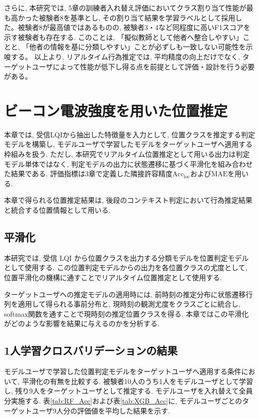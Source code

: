 \documentclass[a4paper,12pt]{jreport}
\begin{document}
さらに, 本研究では, 5章の訓練者入れ替え評価においてクラス割り当て性能が最も高かった被験者8を基準とし, その割り当て結果を学習ラベルとして採用した。被験者8が最高値ではあるものの, 被験者3・4など同程度に高いF1スコアを示す被験者も存在する. このことは, 「擬似教師として他者へ整合しやすい」ことと, 「他者の情報を基に分類しやすい」ことが必ずしも一致しない可能性を示唆する。
以上より, リアルタイム行為推定では, 平均精度の向上だけでなく, ターゲットユーザによって性能が低下し得る点を前提として評価・設計を行う必要がある。



\chapter{ビーコン電波強度を用いた位置推定}
本章では, 受信LQIから抽出した特徴量を入力として, 位置クラスを推定する判定モデルを構築し, モデルユーザで学習したモデルをターゲットユーザへ適用する枠組みを扱う. ただし, 本研究でリアルタイム位置推定として用いる出力は判定モデル単体ではなく, 判定モデルの出力に状態遷移に基づく平滑化を組み合わせた結果である. 評価指標は3章で定義した隣接許容精度$\mathrm{Acc}_{\mathrm{loc}}$および$\mathrm{MAE}$を用いる.

本章で得られる位置推定結果は, 後段のコンテキスト判定において行為推定結果と統合する位置情報として用いる.

\section{平滑化}
本研究では, 受信 LQI から位置クラスを出力する分類モデルを位置判定モデルとして使用する. この位置判定モデルからの出力を各位置クラスの尤度として, 位置平滑化の機構に通すことでリアルタイム位置推定として使用する. 

ターゲットユーザへの推定モデルの適用時には, 前時刻の推定分布に状態遷移行列を適用して得られる事前分布と, 現時刻の観測尤度をクラスごとに統合し, softmax関数を通すことで現時刻の推定位置クラスを得る. 本章ではこの平滑化がどのような影響を結果に与えるのかを分析する. 


\section{1人学習クロスバリデーションの結果}
モデルユーザで学習した位置判定モデルをターゲットユーザへ適用する条件において, 平滑化の有無を比較する. 被験者10人のうち1人をモデルユーザとして学習し, 残り9人をターゲットユーザとして推定する. モデルユーザを入れ替えて全員分実施する. 表\ref{tab:RF_Acc}および表\ref{tab:XGB_Acc}に, モデルユーザごとのターゲットユーザ9人分の評価値を平均した結果を示す. 
\end{document}
